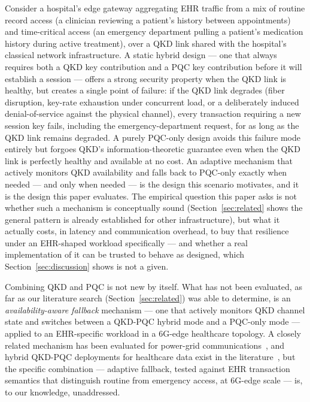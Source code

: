 \documentclass[journal]{IEEEtran}
\begin{document}
Consider a hospital's edge gateway aggregating EHR traffic from a mix of routine record access (a clinician reviewing a patient's history between appointments) and time-critical access (an emergency department pulling a patient's medication history during active treatment), over a QKD link shared with the hospital's classical network infrastructure. A static hybrid design --- one that always requires both a QKD key contribution and a PQC key contribution before it will establish a session --- offers a strong security property when the QKD link is healthy, but creates a single point of failure: if the QKD link degrades (fiber disruption, key-rate exhaustion under concurrent load, or a deliberately induced denial-of-service against the physical channel), every transaction requiring a new session key fails, including the emergency-department request, for as long as the QKD link remains degraded. A purely PQC-only design avoids this failure mode entirely but forgoes QKD's information-theoretic guarantee even when the QKD link is perfectly healthy and available at no cost. An adaptive mechanism that actively monitors QKD availability and falls back to PQC-only exactly when needed --- and only when needed --- is the design this scenario motivates, and it is the design this paper evaluates. The empirical question this paper asks is not whether such a mechanism is conceptually sound (Section~\ref{sec:related} shows the general pattern is already established for other infrastructure), but what it actually costs, in latency and communication overhead, to buy that resilience under an EHR-shaped workload specifically --- and whether a real implementation of it can be trusted to behave as designed, which Section~\ref{sec:discussion} shows is not a given.

Combining QKD and PQC is not new by itself. What has not been evaluated, as far as our literature search (Section~\ref{sec:related}) was able to determine, is an \emph{availability-aware fallback} mechanism --- one that actively monitors QKD channel state and switches between a QKD-PQC hybrid mode and a PQC-only mode --- applied to an EHR-specific workload in a 6G-edge healthcare topology. A closely related mechanism has been evaluated for power-grid communications~\cite{zhu2025technoeconomic}, and hybrid QKD-PQC deployments for healthcare data exist in the literature~\cite{devaraj2026postquantum,roosan2025pqctelehealth,papadopoulos2026hybriddeployment}, but the specific combination --- adaptive fallback, tested against EHR transaction semantics that distinguish routine from emergency access, at 6G-edge scale --- is, to our knowledge, unaddressed.
\end{document}
